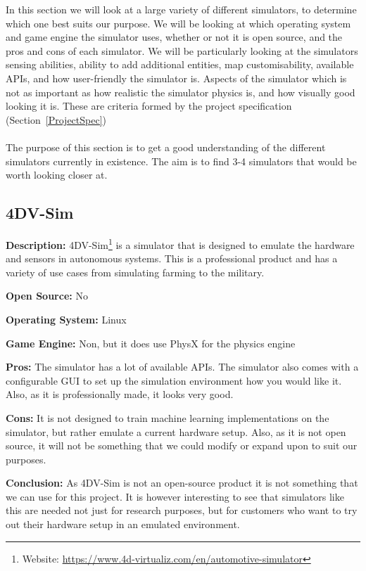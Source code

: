 In this section we will look at a large variety of different simulators, to determine which one best suits our purpose. We will be looking at which operating system and game engine the simulator uses, whether or not it is open source, and the pros and cons of each simulator. We will be particularly looking at the simulators sensing abilities, ability to add additional entities, map customisability, available APIs, and how user-friendly the simulator is. Aspects of the simulator which is not as important as how realistic the simulator physics is, and how visually good looking it is. These are criteria formed by the project specification (Section~\ref{ProjectSpec})
\\~\\
The purpose of this section is to get a good understanding of the different simulators currently in existence. The aim is to find 3-4 simulators that would be worth looking closer at.

\subsection{4DV-Sim}
\textbf{Description:} 4DV-Sim\footnote{Website: \url{https://www.4d-virtualiz.com/en/automotive-simulator}} is a simulator that is designed to emulate the hardware and sensors in autonomous systems. This is a professional product and has a variety of use cases from simulating farming to the military.

\textbf{Open Source:} No

\textbf{Operating System:} Linux

\textbf{Game Engine:} Non, but it does use PhysX for the physics engine

\textbf{Pros:} The simulator has a lot of available APIs. The simulator also comes with a configurable GUI to set up the simulation environment how you would like it. Also, as it is professionally made, it looks very good.   

\textbf{Cons:} It is not designed to train machine learning implementations on the simulator, but rather emulate a current hardware setup. Also, as it is not open source, it will not be something that we could modify or expand upon to suit our purposes. 

\textbf{Conclusion:} As 4DV-Sim is not an open-source product it is not something that we can use for this project. It is however interesting to see that simulators like this are needed not just for research purposes, but for customers who want to try out their hardware setup in an emulated environment.


